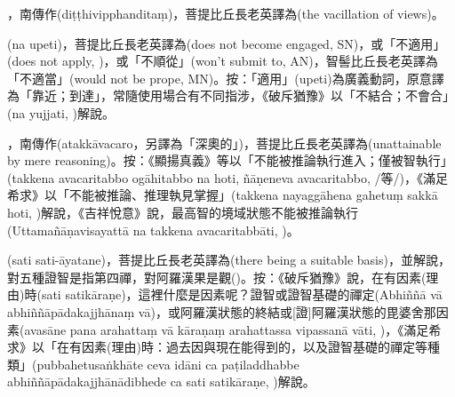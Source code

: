 \startitemgroup[noteitems]
\item{}，南傳作(diṭṭhivipphanditaṃ)，菩提比丘長老英譯為(the vacillation of views)。
\stopitemgroup

\startitemgroup[noteitems]
\item{}(na upeti)，菩提比丘長老英譯為(does not become engaged, SN)，或「不適用」(does not apply, )，或「不順從」(won't submit to, AN)，智髻比丘長老英譯為「不適當」(would not be prope, MN)。按：「適用」(upeti)為廣義動詞，原意譯為「靠近；到達」，常隨使用場合有不同指涉，《破斥猶豫》以「不結合；不會合」(na yujjati, )解說。
\stopitemgroup

\startitemgroup[noteitems]
\item{}，南傳作(atakkāvacaro，另譯為「深奧的」)，菩提比丘長老英譯為(unattainable by mere reasoning)。按：《顯揚真義》等以「不能被推論執行進入；僅被智執行」(takkena avacaritabbo ogāhitabbo na hoti, ñāṇeneva avacaritabbo, /等/)，《滿足希求》以「不能被推論、推理執見掌握」(takkena nayaggāhena gahetuṃ sakkā hoti, )解說，《吉祥悅意》說，最高智的境域狀態不能被推論執行(Uttamañāṇavisayattā na takkena avacaritabbāti, )。
\stopitemgroup

\startitemgroup[noteitems]
\item{}(sati sati-āyatane)，菩提比丘長老英譯為(there being a suitable basis)，並解說，對五種證智是指第四禪，對阿羅漢果是觀()。按：《破斥猶豫》說，在有因素(理由)時(sati satikāraṇe)，這裡什麼是因素呢？證智或證智基礎的禪定(Abhiññā vā abhiññāpādakajjhānaṃ vā)，或阿羅漢狀態的終結或[證]阿羅漢狀態的毘婆舍那因素(avasāne pana arahattaṃ vā kāraṇaṃ arahattassa vipassanā vāti, )，《滿足希求》以「在有因素(理由)時：過去因與現在能得到的，以及證智基礎的禪定等種類」(pubbahetusaṅkhāte ceva idāni ca paṭiladdhabbe abhiññāpādakajjhānādibhede ca sati satikāraṇe, )解說。
\stopitemgroup

